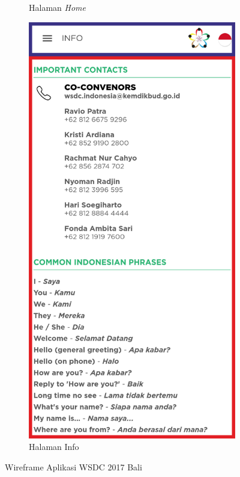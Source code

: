 \begin{figure}[H]
\begin{subfigure}[b]{0.247\textwidth}
	    \caption{Halaman {\it Home}}
	    \label{fig:homePageWireframe}
     \end{subfigure}
     \begin{subfigure}[b]{0.247\textwidth}
    \centering
	    \includegraphics[scale=0.4]{Gambar/InfoPageWireframe.png}
	    \caption{Halaman Info}
	    \label{fig:InfoPageWireframe}
     \end{subfigure}
        \caption{Wireframe Aplikasi WSDC 2017 Bali}
        \label{fig:three graphs}
\end{figure}

